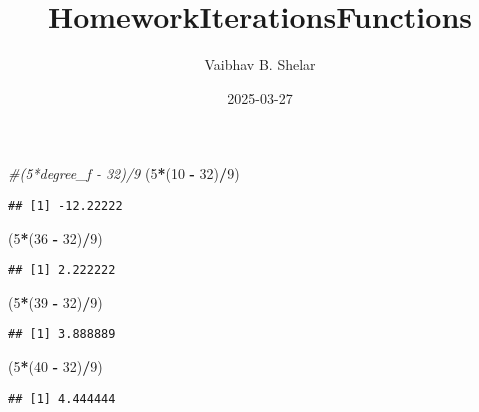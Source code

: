 \documentclass[
]{article}
\title{HomeworkIterationsFunctions}
\author{Vaibhav B. Shelar}
\date{2025-03-27}
\newenvironment{Shaded}{\begin{snugshade}}{\end{snugshade}}
\newcommand{\CommentTok}[1]{\textcolor[rgb]{0.56,0.35,0.01}{\textit{#1}}}
\newcommand{\DecValTok}[1]{\textcolor[rgb]{0.00,0.00,0.81}{#1}}
\newcommand{\NormalTok}[1]{#1}
\newcommand{\SpecialCharTok}[1]{\textcolor[rgb]{0.81,0.36,0.00}{\textbf{#1}}}
\begin{document}
\maketitle

\begin{Shaded}
\begin{Highlighting}[]
\CommentTok{\#(5*degree\_f {-} 32)/9}
\NormalTok{(}\DecValTok{5}\SpecialCharTok{*}\NormalTok{(}\DecValTok{10} \SpecialCharTok{{-}} \DecValTok{32}\NormalTok{)}\SpecialCharTok{/}\DecValTok{9}\NormalTok{)}
\end{Highlighting}
\end{Shaded}

\begin{verbatim}
## [1] -12.22222
\end{verbatim}

\begin{Shaded}
\begin{Highlighting}[]
\NormalTok{(}\DecValTok{5}\SpecialCharTok{*}\NormalTok{(}\DecValTok{36} \SpecialCharTok{{-}} \DecValTok{32}\NormalTok{)}\SpecialCharTok{/}\DecValTok{9}\NormalTok{)}
\end{Highlighting}
\end{Shaded}

\begin{verbatim}
## [1] 2.222222
\end{verbatim}

\begin{Shaded}
\begin{Highlighting}[]
\NormalTok{(}\DecValTok{5}\SpecialCharTok{*}\NormalTok{(}\DecValTok{39} \SpecialCharTok{{-}} \DecValTok{32}\NormalTok{)}\SpecialCharTok{/}\DecValTok{9}\NormalTok{)}
\end{Highlighting}
\end{Shaded}

\begin{verbatim}
## [1] 3.888889
\end{verbatim}

\begin{Shaded}
\begin{Highlighting}[]
\NormalTok{(}\DecValTok{5}\SpecialCharTok{*}\NormalTok{(}\DecValTok{40} \SpecialCharTok{{-}} \DecValTok{32}\NormalTok{)}\SpecialCharTok{/}\DecValTok{9}\NormalTok{)}
\end{Highlighting}
\end{Shaded}

\begin{verbatim}
## [1] 4.444444
\end{verbatim}
\end{document}
